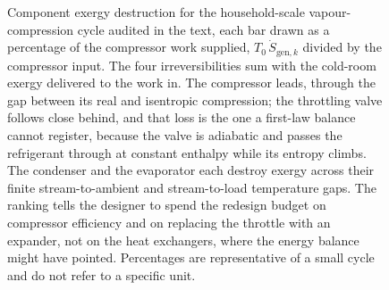 \begin{figure}[htbp]
\centering
{}
\caption[Exergy destruction by component in a refrigeration cycle]{Component
exergy destruction for the household-scale vapour-compression cycle audited in the
text, each bar drawn as a percentage of the compressor work supplied,
$T_0\,\dot S_{\mathrm{gen},k}$ divided by the compressor input. The four
irreversibilities sum with the cold-room exergy delivered to the work in. The
compressor leads, through the gap between its real and isentropic compression; the
throttling valve follows close behind, and that loss is the one a first-law
balance cannot register, because the valve is adiabatic and passes the refrigerant
through at constant enthalpy while its entropy climbs. The condenser and the
evaporator each destroy exergy across their finite stream-to-ambient and
stream-to-load temperature gaps. The ranking tells the designer to spend the
redesign budget on compressor efficiency and on replacing the throttle with an
expander, not on the heat exchangers, where the energy balance might have pointed.
Percentages are representative of a small cycle and do not refer to a specific
unit.}
\label{fig:vol04ch04:refrigeration-exergy-bars}
\end{figure}
